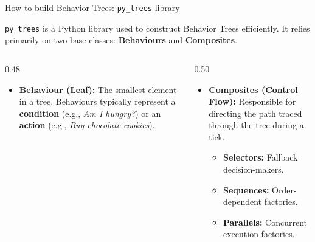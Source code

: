 \documentclass[10pt]{beamer}
\begin{document}
\begin{frame}{How to build Behavior Trees: \texttt{py\_trees} library}
    
    \texttt{py\_trees} is a Python library used to construct Behavior Trees efficiently. It relies primarily on two base classes: \textbf{Behaviours} and \textbf{Composites}.
    
    \vspace{0.3cm}
    
    \begin{columns}[T]
        \begin{column}{0.48\textwidth}
            \begin{itemize}
                \item \textbf{Behaviour (Leaf):} The smallest element in a tree. Behaviours typically represent a \textbf{condition} (e.g., \textit{Am I hungry?}) or an \textbf{action} (e.g., \textit{Buy chocolate cookies}).
            \end{itemize}
        \end{column}
        
        \begin{column}{0.50\textwidth}
            \begin{itemize}
                \item \textbf{Composites (Control Flow):} Responsible for directing the path traced through the tree during a tick. 
                \begin{itemize}
                    \item \textbf{Selectors:} Fallback decision-makers.
                    \item \textbf{Sequences:} Order-dependent factories.
                    \item \textbf{Parallels:} Concurrent execution factories.
                \end{itemize}
            \end{itemize}
        \end{column}
    \end{columns}
    
    \vspace{0.5cm}
    

\end{frame}
\end{document}
